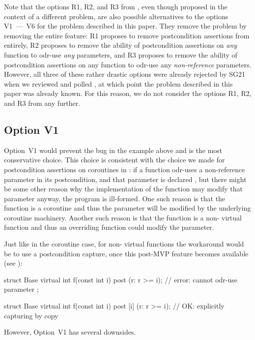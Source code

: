 Note that the options R1, R2, and R3 from \cite{P3487R0}, even though proposed in the context of a different problem,  are also possible alternatives to the options V1~---~V6 for the problem described in this paper. They remove the problem by removing the entire feature: R1 proposes to remove postcondition assertions from \cite{P2900R10} entirely, R2 proposes to remove the ability of postcondition assertions on \emph{any} function to odr-use \emph{any} parameters, and R3 proposes to remove the ability of postcondition assertions on any function to odr-use any \emph{non-reference} parameters. However, all three of these rather drastic options were already rejected by SG21 when we reviewed and polled \cite{P3487R0}, at which point the problem described in this paper was already known. For this reason, we do not consider the options R1, R2, and R3 from \cite{P3487R0} any further.

\subsection*{Option V1}

Option~V1 would prevent the bug in the example above and is the most conservative choice. This choice is consistent with the choice we made for postcondition assertions on coroutines in \cite{P2900R10}: if a function odr-uses a non-reference parameter in its postcondition, and that parameter is declared , but there might be some other reason why the implementation of the function may modify that parameter anyway, the program is ill-formed. One such reason is that the function is a coroutine and thus the parameter will be modified by the underlying coroutine machinery. Another such reason is that the function is a non- virtual function and thus an overriding function could modify the parameter.

Just like in the coroutine case, for non- virtual functions the workaround would be to use a postcondition capture, once this post-MVP feature becomes available (see \cite{P3098R0}):
\begin{codeblock}
struct Base {
  virtual int f(const int i) post (r: r >= i);     // error: cannot odr-use parameter  
};

struct Base {
  virtual int f(const int i) post [i] (r: r >= i); // OK: explicitly capturing  by copy
}
\end{codeblock}

However, Option~V1 has several downsides.

